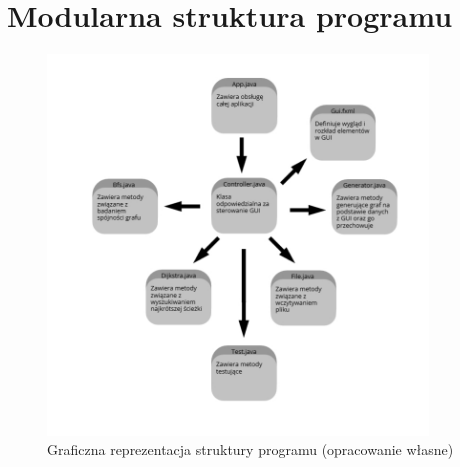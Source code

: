 \documentclass{article}
\begin{document}
\section{Modularna struktura programu}
\begin{figure}[htp]
\centering
\includegraphics[width=0.9\textwidth]{moduly.jpeg}
\caption{\label{fig:mod}Graficzna reprezentacja struktury programu (opracowanie własne)}
\end{figure}
\end{document}
